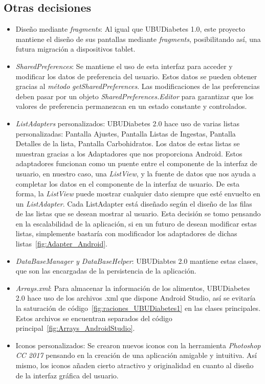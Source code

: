 \subsection{Otras decisiones}
\begin{itemize}
	\item Diseño mediante \textit{fragments}: Al igual que UBUDiabetes 1.0, este proyecto mantiene el diseño de sus pantallas mediante \textit{fragments}, posibilitando así, una futura migración a dispositivos tablet.
	\item \textit{SharedPreferences}: Se mantiene el uso de esta interfaz para acceder y modificar los datos de preferencia del usuario. Estos datos se pueden obtener gracias al \textit{método} \textit{getSharedPreferences}. Las modificaciones de las preferencias deben pasar por un objeto \textit{SharedPreferences.Editor} para garantizar que los valores de preferencia permanezcan en un estado constante y controlados.
	\item \textit{ListAdapters} personalizados: UBUDiabetes 2.0 hace uso de varias listas personalizadas: Pantalla Ajustes, Pantalla Listas de Ingestas, Pantalla Detalles de la lista, Pantalla Carbohidratos. Los datos de estas listas se muestran gracias a los Adaptadores que nos proporciona Android. Estos adaptadores funcionan como un puente entre el componente de la interfaz de usuario, en nuestro caso, una \textit{ListView}, y la fuente de datos que nos ayuda a completar los datos en el componente de la interfaz de usuario. De esta forma, la \textit{ListView} puede mostrar cualquier dato siempre que esté envuelto en un \textit{ListAdapter}.
	Cada ListAdapter está diseñado según el diseño de las filas de las listas que se desean mostrar al usuario. Esta decisión se tomo pensando en la escalabilidad de la aplicación, si en un futuro de desean modificar estas listas, simplemente bastaría con modificador los adaptadores de dichas listas~\ref{fig:Adapter_Android}.
	\newpage
	\item \textit{DataBaseManager y DataBaseHelper}: UBUDiabtes 2.0 mantiene estas clases, que son las encargadas de la persistencia de la aplicación.
	\item \textit{Arrays.xml}: Para almacenar la información de los alimentos, UBUDiabetes 2.0 hace uso de los archivos .xml que dispone Android Studio, así se evitaría la saturación de código~\ref{fig:raciones_UBUDiabetes1} en las clases principales. Estos archivos se encuentran separados del código principal~\ref{fig:Arrays_AndroidStudio}.
	\item Iconos personalizados: Se crearon nuevos iconos con la herramienta \textit{Photoshop CC 2017} pensando en la creación de una aplicación amigable y intuitiva. Así mismo, los iconos añaden cierto atractivo y originalidad en cuanto al diseño de la interfaz gráfica del usuario.
\end{itemize}
	
